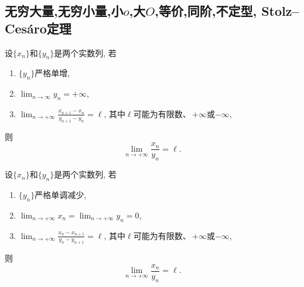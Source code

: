 \subsection{无穷大量,无穷小量,小\(o\),大\(O\),等价,同阶,不定型, Stolz--Ces\'{a}ro定理}
\begin{theorem}\label{C20}
  设\(\{x_n\}\)和\(\{y_n\}\)是两个实数列, 若
  \begin{enumerate}[label=(\roman*)]
    \item \(\{y_n\}\)严格单增,
    \item \(\lim_{n\rightarrow\infty}y_n=+\infty\),
    \item \(\lim_{n\rightarrow+\infty}\frac{x_{n+1}-x_n}{y_{n+1}-y_n}=\ell\), 
    其中\(\ell\)可能为有限数、\,\(+\infty\)或\(-\infty\),   
  \end{enumerate}则\[\lim_{n\rightarrow+\infty}\frac{x_n}{y_n}=\ell.\]  
\end{theorem}
\begin{theorem}\label{C21}
  设\(\{x_n\}\)和\(\{y_n\}\)是两个实数列, 若
  \begin{enumerate}[label=(\roman*)]
    \item \(\{y_n\}\)严格单调减少,
    \item \(\lim_{n\rightarrow+\infty}x_n=\lim_{n\rightarrow+\infty}y_n=0\),
    \item \(\lim_{n\rightarrow+\infty}\frac{x_n-x_{n+1}}{y_{n}-y_{n+1}}=\ell\), 
    其中\(\ell\)可能为有限数、\,\(+\infty\)或\(-\infty\),   
  \end{enumerate}则\[\lim_{n\rightarrow+\infty}\frac{x_n}{y_n}=\ell.\]  
\end{theorem}
